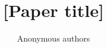 \documentclass{article}
\title{[Paper title]}
\author{Anonymous authors}
\begin{document}
\maketitle

\begin{abstract}

\end{abstract}







% 
% 

\appendix

\end{document}
